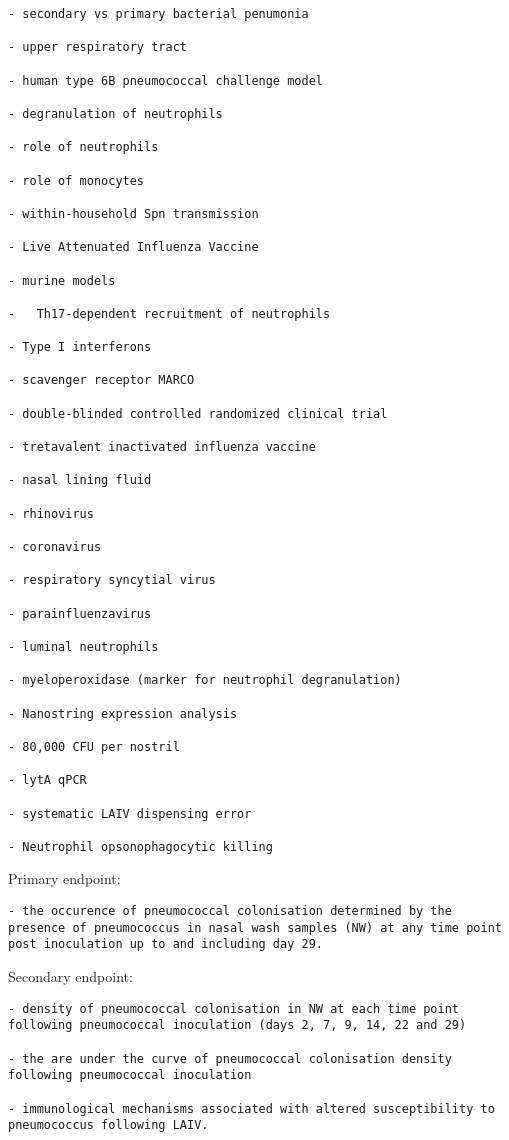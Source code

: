 \documentclass[
]{book}
\begin{document}
\begin{verbatim}
- secondary vs primary bacterial penumonia

- upper respiratory tract

- human type 6B pneumococcal challenge model

- degranulation of neutrophils

- role of neutrophils

- role of monocytes

- within-household Spn transmission

- Live Attenuated Influenza Vaccine

- murine models

-   Th17-dependent recruitment of neutrophils

- Type I interferons

- scavenger receptor MARCO

- double-blinded controlled randomized clinical trial

- tretavalent inactivated influenza vaccine

- nasal lining fluid

- rhinovirus

- coronavirus

- respiratory syncytial virus

- parainfluenzavirus

- luminal neutrophils

- myeloperoxidase (marker for neutrophil degranulation)

- Nanostring expression analysis

- 80,000 CFU per nostril

- lytA qPCR

- systematic LAIV dispensing error

- Neutrophil opsonophagocytic killing
\end{verbatim}

Primary endpoint:

\begin{verbatim}
- the occurence of pneumococcal colonisation determined by the presence of pneumococcus in nasal wash samples (NW) at any time point post inoculation up to and including day 29.
\end{verbatim}

Secondary endpoint:

\begin{verbatim}
- density of pneumococcal colonisation in NW at each time point following pneumococcal inoculation (days 2, 7, 9, 14, 22 and 29)

- the are under the curve of pneumococcal colonisation density following pneumococcal inoculation

- immunological mechanisms associated with altered susceptibility to pneumococcus following LAIV.
\end{verbatim}
\end{document}
